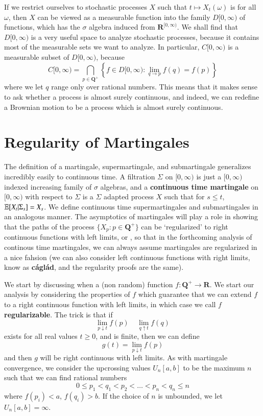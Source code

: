 If we restrict ourselves to stochastic processes $X$ such that $t \mapsto X_t(\omega)$ is \cadlag for all $\omega$, then $X$ can be viewed as a measurable function into the family $D[0,\infty)$ of \cadlag functions, which has the $\sigma$ algebra induced from $\mathbf{R}^{[0,\infty)}$. We shall find that $D[0,\infty)$ is a very useful space to analyze stochastic processes, because it contains most of the measurable sets we want to analyze. In particular, $C[0,\infty)$ is a measurable subset of $D[0,\infty)$, because
%
\[ C[0,\infty) = \bigcap_{p \in \mathbf{Q}^+} \left\{ f \in D[0,\infty): \lim_{q \to p} f(q) = f(p) \right\} \]
%
where we let $q$ range only over rational numbers. This means that it makes sense to ask whether a \cadlag process is almost surely continuous, and indeed, we can redefine a Brownian motion to be a \cadlag process which is almost surely continuous.

\section{Regularity of Martingales}

The definition of a martingale, supermartingale, and submartingale generalizes incredibly easily to continuous time. A filtration $\Sigma$ on $[0,\infty)$ is just a $[0,\infty)$ indexed increasing family of $\sigma$ algebras, and a {\bf continuous time martingale} on $[0,\infty)$ with respect to $\Sigma$ is a $\Sigma$ adapted process $X$ such that for $s \leq t$, $\operatorname{\mathbb{E}}[X_t|\Sigma_s] = X_s$. We define continuous time supermartingales and submartingales in an analogous manner. The asymptotics of martingales will play a role in showing that the paths of the process $\{ X_p: p \in \mathbf{Q}^+ \}$ can be `regularized' to right continuous functions with left limits, or {\bf \cadlag}, so that in the forthcoming analysis of continous time martingales, we can always assume martingales are regularized in a nice fahsion (we can also consider left continuous functions with right limits, know as {\bf c\'{a}gl\'{a}d}, and the regularity proofs are the same).

We start by discussing when a (non random) function $f: \mathbf{Q}^+ \to \mathbf{R}$. We start our analysis by considering the properties of $f$ which guarantee that we can extend $f$ to a right continuous function with left limits, in which case we call $f$ {\bf regularizable}. The trick is that if
%
\[ \lim_{p \downarrow t} f(p)\ \ \ \ \ \lim_{q \uparrow t} f(q) \]
%
exists for all real values $t \geq 0$, and is finite, then we can define
%
\[ g(t) = \lim_{p \downarrow t} f(p) \]
%
and then $g$ will be right continuous with left limits. As with martingale convergence, we consider the upcrossing values $U_n[a,b]$ to be the maximum $n$ such that we can find rational numbers
%
\[ 0 \leq p_1 < q_1 < p_2 < \dots < p_n < q_n \leq n \]
%
where $f(p_i) < a$, $f(q_i) > b$. If the choice of $n$ is unbounded, we let $U_n[a,b] = \infty$.

